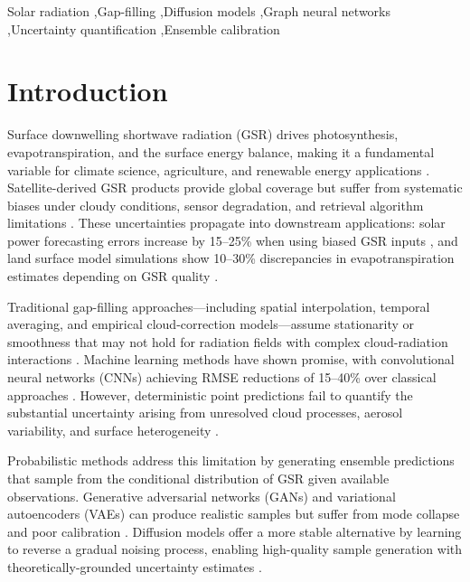 \documentclass[preprint,12pt]{elsarticle}
\begin{document}
\begin{frontmatter}
\begin{keyword}
Solar radiation \sep Gap-filling \sep Diffusion models \sep Graph neural networks \sep Uncertainty quantification \sep Ensemble calibration
\end{keyword}

\end{frontmatter}

\section{Introduction}
\label{sec:intro}

Surface downwelling shortwave radiation (GSR) drives photosynthesis, evapotranspiration, and the surface energy balance, making it a fundamental variable for climate science, agriculture, and renewable energy applications \cite{trenberth2009earth, wild2005decadal}. Satellite-derived GSR products provide global coverage but suffer from systematic biases under cloudy conditions, sensor degradation, and retrieval algorithm limitations \cite{pinker2005surface, zhang2015evaluation}. These uncertainties propagate into downstream applications: solar power forecasting errors increase by 15--25\% when using biased GSR inputs \cite{yang2018solar}, and land surface model simulations show 10--30\% discrepancies in evapotranspiration estimates depending on GSR quality \cite{fisher2008global}.

Traditional gap-filling approaches---including spatial interpolation, temporal averaging, and empirical cloud-correction models---assume stationarity or smoothness that may not hold for radiation fields with complex cloud-radiation interactions \cite{boilley2015comparison}. Machine learning methods have shown promise, with convolutional neural networks (CNNs) achieving RMSE reductions of 15--40\% over classical approaches \cite{gao2020deep, yan2020solar}. However, deterministic point predictions fail to quantify the substantial uncertainty arising from unresolved cloud processes, aerosol variability, and surface heterogeneity \cite{yu2019evaluation}.

Probabilistic methods address this limitation by generating ensemble predictions that sample from the conditional distribution of GSR given available observations. Generative adversarial networks (GANs) \cite{goodfellow2014generative} and variational autoencoders (VAEs) \cite{kingma2014auto} can produce realistic samples but suffer from mode collapse and poor calibration \cite{theis2016note}. Diffusion models \cite{ho2020denoising, sohl2015deep} offer a more stable alternative by learning to reverse a gradual noising process, enabling high-quality sample generation with theoretically-grounded uncertainty estimates \cite{luo2022understanding}.
\end{document}
